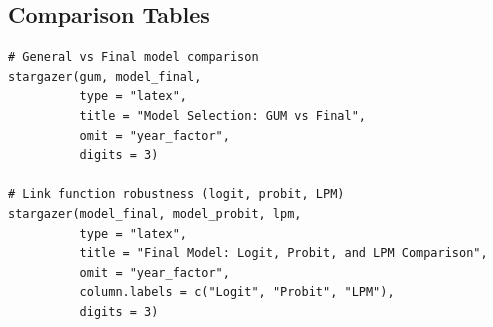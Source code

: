 \documentclass[11pt,a4paper]{article}
\begin{document}
\subsection{Comparison Tables}

\begin{verbatim}
# General vs Final model comparison
stargazer(gum, model_final,
          type = "latex",
          title = "Model Selection: GUM vs Final",
          omit = "year_factor",
          digits = 3)

# Link function robustness (logit, probit, LPM)
stargazer(model_final, model_probit, lpm,
          type = "latex",
          title = "Final Model: Logit, Probit, and LPM Comparison",
          omit = "year_factor",
          column.labels = c("Logit", "Probit", "LPM"),
          digits = 3)
\end{verbatim}
\end{document}
